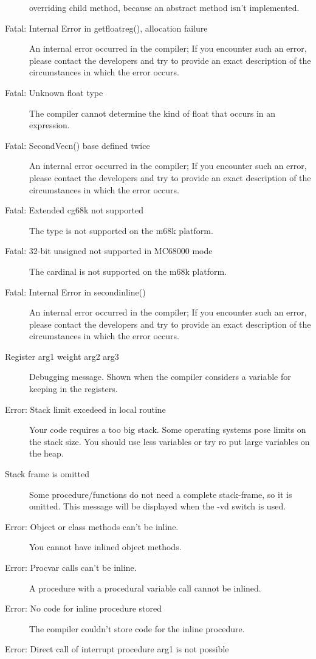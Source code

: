 \begin{description}
 overriding child method, because an abstract method isn't implemented.
\item [Fatal: Internal Error in getfloatreg(), allocation failure]
 An internal error occurred in the compiler; If you encounter such an error,
 please contact the developers and try to provide  an exact description of
 the circumstances in which the error occurs.
\item [Fatal: Unknown float type]
 The compiler cannot determine the kind of float that occurs in an expression.
\item [Fatal: SecondVecn() base defined twice]
 An internal error occurred in the compiler; If you encounter such an error,
 please contact the developers and try to provide  an exact description of
 the circumstances in which the error occurs.
\item [Fatal: Extended cg68k not supported]
 The  type is not supported on the m68k platform.
\item [Fatal: 32-bit unsigned not supported in MC68000 mode]
 The cardinal is not supported on the m68k platform.
\item [Fatal: Internal Error in secondinline()]
 An internal error occurred in the compiler; If you encounter such an error,
 please contact the developers and try to provide  an exact description of
 the circumstances in which the error occurs.
\item [Register arg1 weight arg2 arg3]
 Debugging message. Shown when the compiler considers a variable for
 keeping in the registers.
\item [Error: Stack limit excedeed in local routine]
 Your code requires a too big stack. Some operating systems pose limits
 on the stack size. You should use less variables or try ro put large
 variables on the heap.
\item [Stack frame is omitted]
 Some procedure/functions do not need a complete stack-frame, so it is omitted.
 This message will be displayed when the {-vd} switch is used.
\item [Error: Object or class methods can't be inline.]
 You cannot have inlined object methods.
\item [Error: Procvar calls can't be inline.]
 A procedure with a procedural variable call cannot be inlined.
\item [Error: No code for inline procedure stored]
 The compiler couldn't store code for the inline procedure.
\item [Error: Direct call of interrupt procedure arg1 is not possible]

\end{description}
